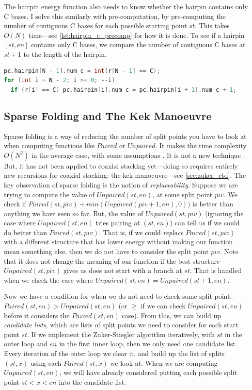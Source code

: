 \documentclass{cshonours}
\begin{document}
The hairpin energy function also needs to know whether the hairpin contains only C bases. I solve this similarly with pre-computation, by pre-computing the number of contiguous C bases for each possible starting point $st$. This takes $O(N)$ time---see \autoref{lst:hairpin_c_precomp} for how it is done. To see if a hairpin $[st, en]$ contains only C bases, we compare the number of contiguous C bases at $st + 1$ to the length of the hairpin.

\begin{lstlisting}[caption={Hairpin contiguous C base pre-computation},label={lst:hairpin_c_precomp},language=C++]
pc.hairpin[N - 1].num_c = int(r[N - 1] == C);
for (int i = N - 2; i >= 0; --i)
  if (r[i] == C) pc.hairpin[i].num_c = pc.hairpin[i + 1].num_c + 1;
\end{lstlisting}


\subsection{Sparse Folding and The Kek Manoeuvre}
\label{ssec:sparse}
Sparse folding is a way of reducing the number of split points you have to look at when computing functions like $Paired$ or $Unpaired$. It makes the time complexity $O(N^2)$ in the average case, with some assumptions \cite{wexlerSparseFolding}. It is not a new technique \cite{backofenSparseFolding, wexlerSparseFolding, willSparseFolding}. But, it has not been applied to coaxial stacking yet---doing so requires entirely new recursions for coaxial stacking: the kek manoeuvre---see \autoref{sec:zuker_ctd}. The key observation of sparse folding is the notion of \emph{replaceability}. Suppose we are trying to compute the value of $Unpaired(st, en)$, at some split point $piv$. We check if $Paired(st, piv) + min(Unpaired(piv + 1, en), 0))$ is better than anything we have seen so far. But, the value of $Unpaired(st, piv)$ (ignoring the case where $Unpaired(st, en)$ tries pairing at $(st, en)$) can tell us if we could do better than $Paired(st, piv)$. That is, if we could \emph{replace} $Paired(st, piv)$ with a different structure that has lower energy without making our function mean something else, then we do not have to consider the split point $piv$. Note that it does not change the meaning of our function if the best structure $Unpaired(st, piv)$ gives us does not start with a branch at $st$. That is handled when we check the case where $Unpaired(st, en) = Unpaired(st + 1, en)$.

Now we have a condition for when we do not need to check some split point: $Paired(st, en) > Unpaired(st, en)$ (or $\geq$ if we can check $Unpaired(st, en)$ before it considers the $Paired(st, en)$ case). From this, we can build up \emph{candidate lists}, which are lists of split points we need to consider for each start point $st$.  If we implement the Zuker-Stiegler algorithm iteratively, with $st$ in the outer loop and $en$ in the first inner loop, then we only need one candidate list. Every iteration of the outer loop we clear it, and build up the list of splits $(st, x)$ using each $Paired(st, x)$ we look at. When we are computing $Unpaired(st, en)$, we will have already considered putting each possible split point $st < x < en$ into the candidate list.
\end{document}
